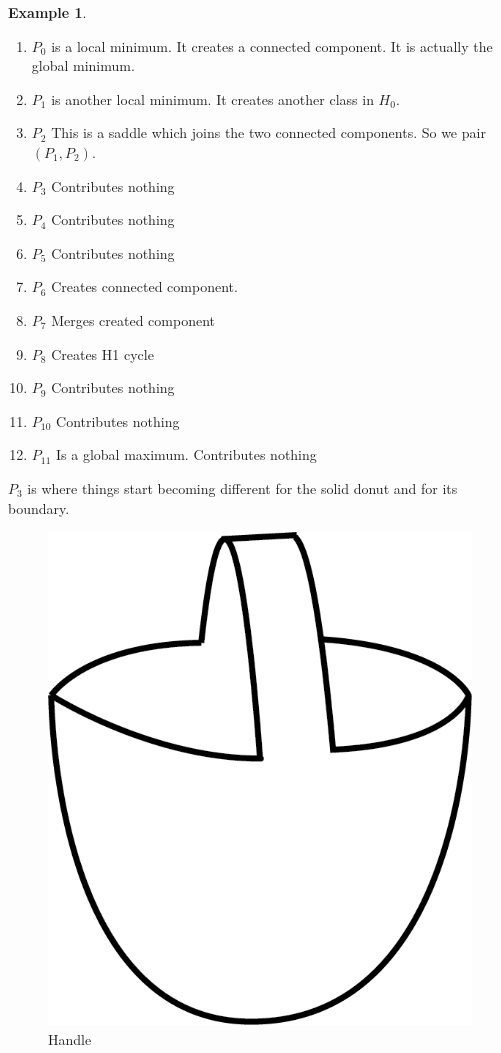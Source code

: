 \documentclass[a4paper]{article}
\theoremstyle{theorem}
\theoremstyle{definition}
\newtheorem{example}{Example}
\theoremstyle{remark}
\theoremstyle{gremark}
\theoremstyle{discussion}
\theoremstyle{notation}
\begin{document}
\begin{example}
	\begin{enumerate}
		\item $P_0$ is a local minimum. It creates a connected component. It is actually the global minimum.
		\item $P_1$ is another local minimum. It creates another class in $H_0$.
		\item $P_2$ This is a saddle which joins the two connected components. So we pair $(P_1,P_2)$.
		\item $P_3$ Contributes nothing
		\item $P_4$ Contributes nothing
		\item $P_5$ Contributes nothing
		\item $P_6$ Creates connected component.
		\item $P_7$ Merges created component
		\item $P_8$ Creates H1 cycle
		\item $P_9$ Contributes nothing
		\item $P_{10}$ Contributes nothing
		\item $P_{11}$ Is a global maximum. Contributes nothing
	\end{enumerate} 

	$P_3$ is where things start becoming different for the solid donut and for its boundary.

	
	
	
	
	
	
	
\end{example}

\begin{figure}[ht]
	\centering
	\includegraphics[scale=0.5]{handle.png}
	\caption{Handle}
\end{figure}
\end{document}
